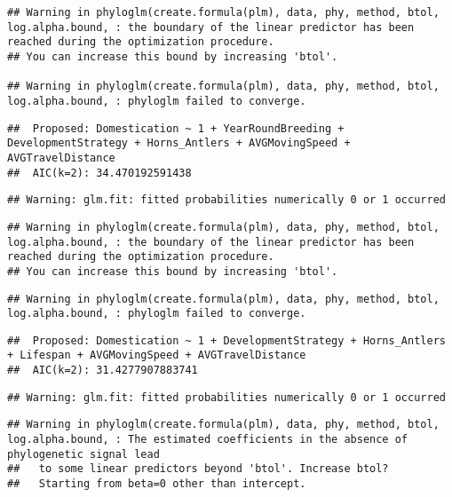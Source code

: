 \documentclass[
]{article}
\begin{document}
\begin{verbatim}
## Warning in phyloglm(create.formula(plm), data, phy, method, btol, log.alpha.bound, : the boundary of the linear predictor has been reached during the optimization procedure.
## You can increase this bound by increasing 'btol'.

## Warning in phyloglm(create.formula(plm), data, phy, method, btol, log.alpha.bound, : phyloglm failed to converge.
\end{verbatim}

\begin{verbatim}
##  Proposed: Domestication ~ 1 + YearRoundBreeding + DevelopmentStrategy + Horns_Antlers + AVGMovingSpeed + AVGTravelDistance
##  AIC(k=2): 34.470192591438
\end{verbatim}

\begin{verbatim}
## Warning: glm.fit: fitted probabilities numerically 0 or 1 occurred
\end{verbatim}

\begin{verbatim}
## Warning in phyloglm(create.formula(plm), data, phy, method, btol, log.alpha.bound, : the boundary of the linear predictor has been reached during the optimization procedure.
## You can increase this bound by increasing 'btol'.
\end{verbatim}

\begin{verbatim}
## Warning in phyloglm(create.formula(plm), data, phy, method, btol, log.alpha.bound, : phyloglm failed to converge.
\end{verbatim}

\begin{verbatim}
##  Proposed: Domestication ~ 1 + DevelopmentStrategy + Horns_Antlers + Lifespan + AVGMovingSpeed + AVGTravelDistance
##  AIC(k=2): 31.4277907883741
\end{verbatim}

\begin{verbatim}
## Warning: glm.fit: fitted probabilities numerically 0 or 1 occurred
\end{verbatim}

\begin{verbatim}
## Warning in phyloglm(create.formula(plm), data, phy, method, btol, log.alpha.bound, : The estimated coefficients in the absence of phylogenetic signal lead
##   to some linear predictors beyond 'btol'. Increase btol?
##   Starting from beta=0 other than intercept.
\end{verbatim}
\end{document}
